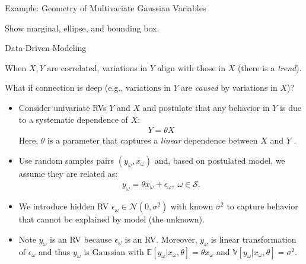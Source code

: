\documentclass[9pt]{beamer}
\begin{document}
%
\begin{frame}{Example: Geometry of Multivariate Gaussian Variables}

\begin{block}{}
Show marginal, ellipse, and bounding box. 
\end{block}

\end{frame}


%
\begin{frame}{Data-Driven Modeling}

When $X,Y$ are correlated, variations in $Y$ align with those in $X$ (there is a {\em trend}). 
\begin{block}{}
What if connection is deep (e.g., variations in $Y$ are {\em caused} by variations in $X$)? 
\end{block}

\begin{itemize}

\item Consider univariate RVs $Y$ and $X$ and postulate that any behavior in $Y$ is due to a systematic dependence of $X$:
\begin{align*}
Y=\theta X
\end{align*}
Here, $\theta$ is a parameter that captures a {\em linear} dependence between $X$ and $Y$ . 

\item Use random samples pairs $(y_\omega,x_\omega)$ and, based on postulated model, we assume they are related as:
\begin{align*}
y_\omega=\theta x_\omega + \epsilon_\omega,\; \omega \in \mathcal{S}.
\end{align*}
\item We introduce hidden RV $\epsilon_\omega\in \mathcal{N}(0,\sigma^2)$ with known $\sigma^2$ to capture behavior that cannot be explained by model (the unknown).  

\item  Note $y_\omega$ is an RV because $\epsilon_\omega$ is an RV. Moreover, $y_\omega$ is linear transformation of $\epsilon_\omega$ and thus $y_\omega$ is Gaussian with $\mathbb{E}[y_\omega|x_\omega,\theta]=\theta x_\omega$ and  $\mathbb{V}[y_\omega|x_\omega,\theta]=\sigma^2$. 

\end{itemize}

\end{frame}
\end{document}
